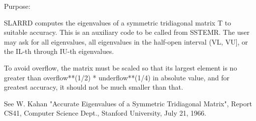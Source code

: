  \begin{DoxyParagraph}{Purpose\+: }
\begin{DoxyVerb} SLARRD computes the eigenvalues of a symmetric tridiagonal
 matrix T to suitable accuracy. This is an auxiliary code to be
 called from SSTEMR.
 The user may ask for all eigenvalues, all eigenvalues
 in the half-open interval (VL, VU], or the IL-th through IU-th
 eigenvalues.

 To avoid overflow, the matrix must be scaled so that its
 largest element is no greater than overflow**(1/2) * underflow**(1/4) in absolute value, and for greatest
 accuracy, it should not be much smaller than that.

 See W. Kahan "Accurate Eigenvalues of a Symmetric Tridiagonal
 Matrix", Report CS41, Computer Science Dept., Stanford
 University, July 21, 1966.\end{DoxyVerb}
 
\end{DoxyParagraph}

